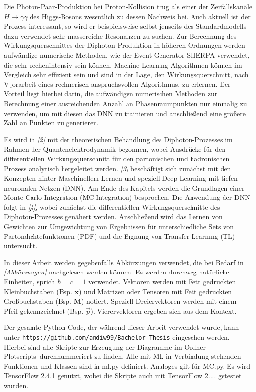 Die Photon-Paar-Produktion bei Proton-Kollision trug als einer der Zerfallskanäle $H \rightarrow \gamma \gamma$ des Higgs-Bosons wesentlich zu dessen Nachweis\cite{Higgs-Disco, Higgs-Dicso-CMS} bei. Auch aktuell ist der Prozess interessant, so wird er beispielsweise selbst jenseits des Standardmodells dazu verwendet sehr massereiche Resonanzen zu suchen\cite{diphoton-aktuell}. Zur Berechnung des Wirkungsquerschnittes der Diphoton-Produktion in höheren Ordnungen werden aufwändige numerische Methoden, wie der Event-Generator SHERPA\cite{SHERPA} verwendet, die sehr rechenintensiv sein können. Machine-Learning-Algorithmen können im Vergleich sehr effizient sein und sind in der Lage, den Wirkungsquerschnitt, nach V¸orarbeit eines rechnerisch anspruchsvollen Algorithmus, zu erlernen. Der Vorteil liegt hierbei darin, die aufwändigen numerischen Methoden zur Berechnung einer ausreichenden Anzahl an Phasenraumpunkten nur einmalig zu verwenden, um mit diesen das DNN zu trainieren und anschließend eine größere Zahl an Punkten zu generieren.

Es wird in \textit{\autoref{2}} mit der theoretischen Behandlung des Diphoton-Prozesses im Rahmen der Quantenelektrodynamik begonnen, wobei Ausdrücke für den differentiellen Wirkungsquerschnitt für den partonischen und hadronischen Prozess analytisch hergeleitet werden. \textit{\autoref{3}} beschäftigt sich zunächst mit den Konzepten hinter Maschinellem Lernen und speziell Deep-Learning mit tiefen neuronalen Netzen (DNN). Am Ende des Kapitels werden die Grundlagen einer Monte-Carlo-Integration (MC-Integration) besprochen. Die Anwendung der DNN folgt in \textit{\autoref{4}}, wobei zunächst die differentiellen Wirkungsquerschnitte des Diphoton-Prozesses genähert werden. Anschließend wird das Lernen von Gewichten zur Umgewichtung von Ergebnissen für unterschiedliche Sets von Partondichtefunktionen (PDF) und die Eignung von Transfer-Learning (TL) untersucht. 

In dieser Arbeit werden gegebenfalls Abkürzungen verwendet, die bei Bedarf in \textit{\autoref{Abkürzungen}} nachgelesen werden können.
Es werden durchweg natürliche Einheiten, sprich $\hbar = c = 1$ verwendet. Vektoren werden mit Fett gedruckten Kleinbuchstaben (Bsp. $\mathbf{x}$) und Matrizen oder Tensoren mit Fett gedruckten Großbuchstaben (Bsp. $\mathbf{M}$) notiert. Speziell Dreiervektoren werden mit einem Pfeil gekennzeichnet (Bsp. $\vec{p}$). Vierervektoren ergeben sich aus dem Kontext. 

Der gesamte Python-Code, der während dieser Arbeit verwendet wurde, kann unter \texttt{https://github.com/andiw99/Bachelor-Thesis} eingesehen werden. Hierbei sind alle Skripte zur Erzeugung der Diagramme im Ordner \glqq Plotscripts\grqq~durchnummeriert zu finden. Alle mit ML in Verbindung stehenden Funktionen und Klassen sind in ml.py definiert. Analoges gilt für MC.py. Es wird TensorFlow\cite{TF} 2.4.1 genutzt, wobei die Skripte auch mit TensorFlow 2.... getestet wurden.

